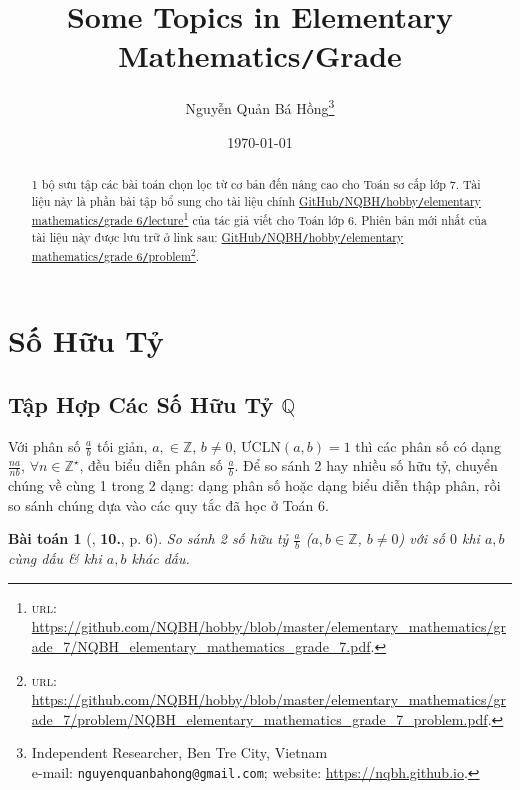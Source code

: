 \documentclass{article}
\title{Some Topics in Elementary Mathematics\texttt{/}Grade }
\author{Nguyễn Quản Bá Hồng\footnote{Independent Researcher, Ben Tre City, Vietnam\\e-mail: \texttt{nguyenquanbahong@gmail.com}; website: \url{https://nqbh.github.io}.}}
\date{\today}
\numberwithin{equation}{section}
\newtheorem{baitoan}{Bài toán}[section]
\begin{document}
\maketitle
\begin{abstract}
	1 bộ sưu tập các bài toán chọn lọc từ cơ bản đến nâng cao cho Toán sơ cấp lớp 7. Tài liệu này là phần bài tập bổ sung cho tài liệu chính \href{https://github.com/NQBH/hobby/blob/master/elementary_mathematics/grade_7/NQBH_elementary_mathematics_grade_7.pdf}{GitHub\texttt{/}NQBH\texttt{/}hobby\texttt{/}elementary mathematics\texttt{/}grade 6\texttt{/}lecture}\footnote{\textsc{url}: \url{https://github.com/NQBH/hobby/blob/master/elementary_mathematics/grade_7/NQBH_elementary_mathematics_grade_7.pdf}.} của tác giả viết cho Toán lớp 6. Phiên bản mới nhất của tài liệu này được lưu trữ ở link sau: \href{https://github.com/NQBH/hobby/blob/master/elementary_mathematics/grade_7/problem/NQBH_elementary_mathematics_grade_7_problem.pdf}{GitHub\texttt{/}NQBH\texttt{/}hobby\texttt{/}elementary mathematics\texttt{/}grade 6\texttt{/}problem}\footnote{\textsc{url}: \url{https://github.com/NQBH/hobby/blob/master/elementary_mathematics/grade_7/problem/NQBH_elementary_mathematics_grade_7_problem.pdf}.}.
\end{abstract}
\tableofcontents
\newpage


\section{Số Hữu Tỷ}

\subsection{Tập Hợp Các Số Hữu Tỷ $\mathbb{Q}$}
Với phân số $\frac{a}{b}$ tối giản, $a,\in\mathbb{Z}$, $b\ne 0$, $\mbox{ƯCLN}(a,b) = 1$ thì các phân số có dạng $\frac{na}{nb}$, $\forall n\in\mathbb{Z}^\star$, đều biểu diễn phân số $\frac{a}{b}$. Để so sánh 2 hay nhiều số hữu tỷ, chuyển chúng về cùng 1 trong 2 dạng: dạng phân số hoặc dạng biểu diễn thập phân, rồi so sánh chúng dựa vào các quy tắc đã học ở Toán 6.

\begin{baitoan}[\cite{Trong_Toan_7_2022}, \textbf{10.}, p. 6]
	So sánh 2 số hữu tỷ $\frac{a}{b}$ ($a,b\in\mathbb{Z}$, $b\ne 0$) với số $0$ khi $a,b$ cùng dấu \& khi $a,b$ khác dấu.
\end{baitoan}
\end{document}
